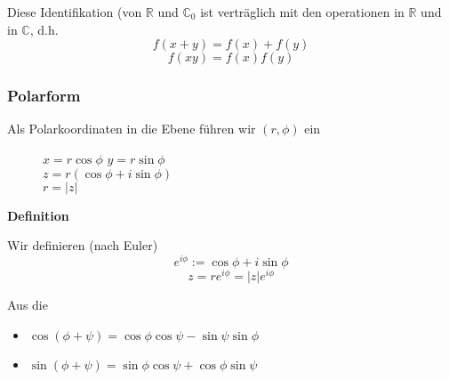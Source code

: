 Diese Identifikation (von $\mathbb{R}$ und $\mathbb{C}_0$ ist verträglich mit den operationen in $\mathbb{R}$ und in $\mathbb{C}$, d.h.
$$f(x+y)=f(x)+f(y)$$
$$f(xy)=f(x)f(y)$$
\subsubsection*{Polarform}
Als Polarkoordinaten in die Ebene führen wir $(r,\phi)$ ein

\begin{figure}[ht]
\begin{minipage}[b]{0.45\linewidth}
\begin{center}
\end{center}

\end{minipage}
\hspace{0.5cm}
\begin{minipage}[b]{0.45\linewidth}
$x=r\cos\phi$\hspace{5mm} $y=r\sin\phi$\\
$z=r\left( \cos\phi + i\sin\phi\right)$\\
$r=\left| z\right|$
\vspace{9mm}
\end{minipage}
\end{figure}

\begin{framed}
\centerline{\textbf{Definition}}
\noindent Wir definieren (nach Euler)$$e^{i\phi}:=\cos\phi+ i\sin\phi$$$$z=re^{i\phi}=\left| z\right|e^{i\phi}$$
\end{framed}

\noindent Aus die 
\begin{itemize}
\item $\cos(\phi+\psi)=\cos\phi\cos\psi -\sin\psi\sin\phi$
\item $\sin(\phi+\psi)=\sin\phi\cos\psi + \cos\phi\sin\psi$
\end{itemize}

